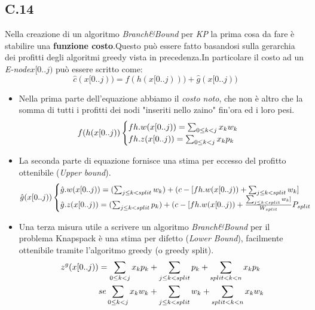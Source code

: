 \documentclass[a4paper]{article}
\begin{document}
\subsection{C.14}
Nella creazione di un algoritmo \textit{Branch\&Bound} per \emph{KP} la prima cosa da fare è stabilire una \textbf{funzione costo}.Questo può essere fatto basandosi sulla gerarchia dei profitti degli algoritmi greedy vista in precedenza.In particolare il costo ad un \textit{E-node}$x[0..j)$ può essere scritto come:
$$\hat{c}(x[0..j)) = f(h(x[0..j))) + \hat{g}(x[0..j))$$
\begin{itemize}
	\item Nella prima parte dell'equazione abbiamo il \textit{costo noto}, che non è altro che la somma di tutti i profitti dei nodi "inseriti nello zaino" fin'ora ed i loro pesi. 
		\begin{equation}
                	f(h(x[0..j))\begin{cases}
			fh.w(x[0..j))= \sum_{0\leq k < j} x_{k}w_{k}\\
			fh.z(x[0..j))= \sum_{0\leq k < j} x_{k}p_{k}\notag
                \end{cases}
	        \end{equation}
	\item La seconda parte di equazione fornisce una stima per eccesso del profitto ottenibile (\textit{Upper bound}).
		\begin{equation}
			\hat{g}(x[0..j))\begin{cases}
				\hat{g}.w(x[0..j))= (\sum_{j\leq k < split} w_{k})+(c-[fh.w(x[0..j)) + \sum_{j\leq k < split} w_{k}]\\
				\hat{g}.z(x[0..j))= (\sum_{j\leq k < split} p_{k})+(c-[fh.w(x[0..j)) + \frac{\sum_{j\leq k < split} w_{k}]}{W_{split}}P_{split} \notag
                	\end{cases}
	        \end{equation}
	\item Una terza misura utile a scrivere un algoritmo \textit{Branch\&Bound} per il problema Knapspack è una stima per difetto (\textit{Lower Bound}), facilmente ottenibile tramite l'algoritmo greedy (o greedy split).
		\begin{align}
				z^g(x[0..j)) &= \sum_{0\leq k < j} x_{k}p_{k} + \sum_{j\leq k < split} p_{k} + \sum_{split < k < n} x_{k}p_{k} \notag \\
			&se \sum_{0\leq k < j} x_{k}w_{k} + \sum_{j\leq k < split} w_{k} + \sum_{split < k < n} x_{k}w_{k}\notag
		\end{align}
\end{itemize}
\end{document}
